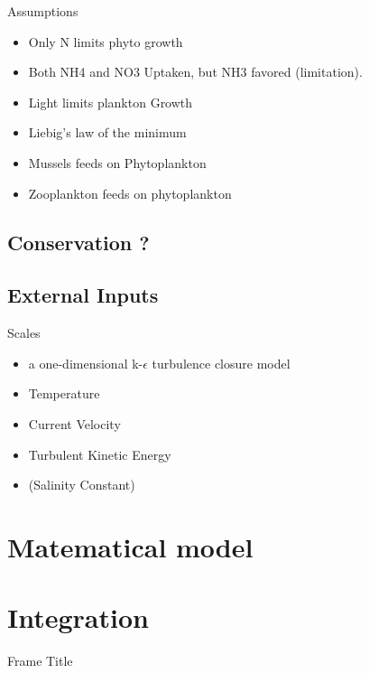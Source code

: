 \documentclass[final,xcolor=dvipsnames]{beamer}
\begin{document}
\begin{frame}
\begin{exampleblock}{Assumptions}
\begin{itemize}
    \item Only N limits phyto growth
    \item Both NH4 and NO3 Uptaken, but NH3 favored (limitation).
    \item Light limits plankton Growth  
    \item Liebig's law of the minimum
    \item Mussels feeds on Phytoplankton
    \item Zooplankton feeds on phytoplankton
\end{itemize} 
\end{exampleblock}
\end{frame}




\subsection{Conservation ?}

\subsection{External Inputs}
\begin{frame}

\begin{exampleblock}{Scales}
\begin{itemize}
    \item a one-dimensional k-$\epsilon$ turbulence closure model 
    \item Temperature
    \item Current Velocity
    \item Turbulent Kinetic Energy
    \item (Salinity Constant)
\end{itemize} 
\end{exampleblock}
\end{frame}

\section{Matematical model}

\section{Integration}
\begin{frame}{Frame Title}
    
\end{frame}
\end{document}
